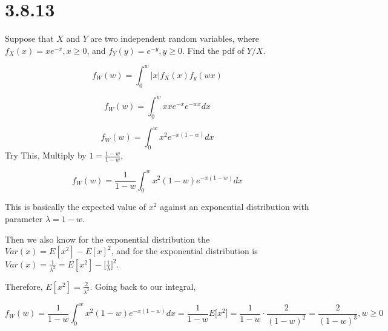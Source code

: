 \documentclass[svgnames]{article}
\begin{document}
\section{3.8.13}
 Suppose that $X$ and $Y$ are two independent random variables, where $f_X(x) = xe^{-x}, x \geq 0$, and $f_Y(y) = e^{-y}, y \geq 0$. Find the pdf of $Y/X$.
 
$$ f_W(w)=\int_{0}^{w}\left|x\right| f_X(x) f_y(wx)$$

$$ f_W(w)=\int_{0}^{w}x x e^{-x}e^{-wx}dx$$

$$ f_W(w)=\int_{0}^{w}x^2 e^{-x(1-w)}dx $$
Try This, Multiply by $1=\frac{1-w}{1-w}$,

$$ f_W(w)=\frac{1}{1-w}\int_{0}^{w}x^2(1-w) e^{-x(1-w)}dx $$

This is basically the expected value of $x^2$ against an exponential distribution with parameter $\lambda= 1-w$.

Then we also know for the exponential distribution the $Var(x)=E[x^2]-E[x]^2$, and for the exponential distribution is $Var(x)=\frac{1}{\lambda^2}=E[x^2] - \Big[\frac{1}{\lambda}\Big]^2$.

Therefore, $E[x^2] =\frac{2}{\lambda^2}$. Going back to our integral,

$$ f_W(w)=\frac{1}{1-w}\int_{0}^{w}x^2(1-w) e^{-x(1-w)}dx = \frac{1}{1-w} E\Big[x^2\Big] =\frac{1}{1-w}\cdot \frac{2}{(1-w)^2}=\frac{2}{(1-w)^3}, w \geq 0$$
\end{document}
